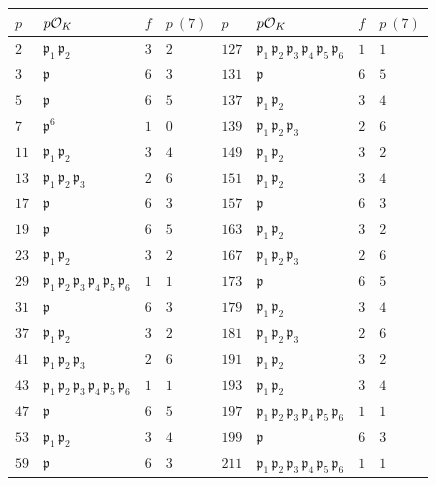 \begin{figure}
\begin{center}
\renewcommand{\arraystretch}{1.5}
\begin{tabular}{x{1cm}x{2.5cm}x{1cm}x{1.25cm}x{1cm}x{2.5cm}x{1cm}x{1.25cm}}
$p$ & $p\mathcal{O}_K$ & $f$ & $p~(7)$ & $p$ & $p\mathcal{O}_K$ & $f$ & $p~(7)$ \tabularnewline
\hline
$2$ & $\mathfrak{p}_1\,\mathfrak{p}_2$ & $3$ & $2$ & $127$ & $\mathfrak{p}_1\,\mathfrak{p}_2\,\mathfrak{p}_3\,\mathfrak{p}_4\,\mathfrak{p}_5\,\mathfrak{p}_6$ & $1$ & $1$ \tabularnewline
\hline
$3$ & $\mathfrak{p}$ & $6$ & $3$ & $131$ & $\mathfrak{p}$ & $6$ & $5$ \tabularnewline
\hline
$5$ & $\mathfrak{p}$ & $6$ & $5$ & $137$ & $\mathfrak{p}_1\,\mathfrak{p}_2$ & $3$ & $4$ \tabularnewline
\hline
$7$ & $\mathfrak{p}^6$ & $1$ & $0$ & $139$ & $\mathfrak{p}_1\,\mathfrak{p}_2\,\mathfrak{p}_3$ & $2$ & $6$ \tabularnewline
\hline
$11$ & $\mathfrak{p}_1\,\mathfrak{p}_2$ & $3$ & $4$ & $149$ & $\mathfrak{p}_1\,\mathfrak{p}_2$ & $3$ & $2$ \tabularnewline
\hline
$13$ & $\mathfrak{p}_1\,\mathfrak{p}_2\,\mathfrak{p}_3$ & $2$ & $6$ & $151$ & $\mathfrak{p}_1\,\mathfrak{p}_2$ & $3$ & $4$ \tabularnewline
\hline
$17$ & $\mathfrak{p}$ & $6$ & $3$ & $157$ & $\mathfrak{p}$ & $6$ & $3$ \tabularnewline
\hline
$19$ & $\mathfrak{p}$ & $6$ & $5$ & $163$ & $\mathfrak{p}_1\,\mathfrak{p}_2$ & $3$ & $2$ \tabularnewline
\hline
$23$ & $\mathfrak{p}_1\,\mathfrak{p}_2$ & $3$ & $2$ & $167$ & $\mathfrak{p}_1\,\mathfrak{p}_2\,\mathfrak{p}_3$ & $2$ & $6$ \tabularnewline
\hline
$29$ & $\mathfrak{p}_1\,\mathfrak{p}_2\,\mathfrak{p}_3\,\mathfrak{p}_4\,\mathfrak{p}_5\,\mathfrak{p}_6$ & $1$ & $1$ & $173$ & $\mathfrak{p}$ & $6$ & $5$ \tabularnewline
\hline
$31$ & $\mathfrak{p}$ & $6$ & $3$ & $179$ & $\mathfrak{p}_1\,\mathfrak{p}_2$ & $3$ & $4$ \tabularnewline
\hline
$37$ & $\mathfrak{p}_1\,\mathfrak{p}_2$ & $3$ & $2$ & $181$ & $\mathfrak{p}_1\,\mathfrak{p}_2\,\mathfrak{p}_3$ & $2$ & $6$ \tabularnewline
\hline
$41$ & $\mathfrak{p}_1\,\mathfrak{p}_2\,\mathfrak{p}_3$ & $2$ & $6$ & $191$ & $\mathfrak{p}_1\,\mathfrak{p}_2$ & $3$ & $2$ \tabularnewline
\hline
$43$ & $\mathfrak{p}_1\,\mathfrak{p}_2\,\mathfrak{p}_3\,\mathfrak{p}_4\,\mathfrak{p}_5\,\mathfrak{p}_6$ & $1$ & $1$ & $193$ & $\mathfrak{p}_1\,\mathfrak{p}_2$ & $3$ & $4$ \tabularnewline
\hline
$47$ & $\mathfrak{p}$ & $6$ & $5$ & $197$ & $\mathfrak{p}_1\,\mathfrak{p}_2\,\mathfrak{p}_3\,\mathfrak{p}_4\,\mathfrak{p}_5\,\mathfrak{p}_6$ & $1$ & $1$ \tabularnewline
\hline
$53$ & $\mathfrak{p}_1\,\mathfrak{p}_2$ & $3$ & $4$ & $199$ & $\mathfrak{p}$ & $6$ & $3$ \tabularnewline
\hline
$59$ & $\mathfrak{p}$ & $6$ & $3$ & $211$ & $\mathfrak{p}_1\,\mathfrak{p}_2\,\mathfrak{p}_3\,\mathfrak{p}_4\,\mathfrak{p}_5\,\mathfrak{p}_6$ & $1$ & $1$ \tabularnewline

\end{tabular}
\end{center}
\end{figure}
